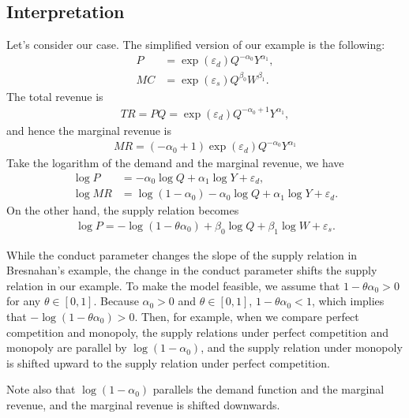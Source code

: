 \documentclass[11pt, a4paper]{article}
\theoremstyle{remark}
\begin{document}
\subsection{Interpretation}




Let's consider our case.
The simplified version of our example is the following:
\begin{align}
    P & = \exp(\varepsilon_{d}) Q^{-\alpha_0} Y^{\alpha_1},\label{eq:simple_demand} \\
    MC & = \exp(\varepsilon_{s}) Q^{\beta_0} W^{\beta_1}. \label{eq:simple_marginal_cost}
\end{align}
The total revenue is
\begin{align}
    TR = PQ = \exp(\varepsilon_{d}) Q^{-\alpha_0+1} Y^{\alpha_1},
\end{align}
and hence the marginal revenue is
\begin{align}
    MR = (-\alpha_0+1)\exp(\varepsilon_{d}) Q^{-\alpha_0} Y^{\alpha_1}
\end{align}
Take the logarithm of the demand and the marginal revenue, we have
\begin{align}
    \log P & = -\alpha_0 \log Q + \alpha_1 \log Y + \varepsilon_d,\\
    \log MR& = \log (1 -\alpha_0) -\alpha_0 \log Q + \alpha_1 \log Y + \varepsilon_d.
\end{align}
On the other hand, the supply relation becomes
\begin{align}
    \log P = -\log (1 - \theta \alpha_0) + \beta_0 \log Q + \beta_1 \log W + \varepsilon_s. \label{eq:simple_supply}
\end{align}

While the conduct parameter changes the slope of the supply relation in Bresnahan's example, the change in the conduct parameter shifts the supply relation in our example.
To make the model feasible, we assume that $1- \theta \alpha_0 >0$ for any $\theta \in [0,1]$.
Because $\alpha_0>0$ and $\theta \in [0,1]$, $1- \theta\alpha_0 <1$, which implies that $- \log(1- \theta\alpha_0) > 0$.
Then, for example, when we compare perfect competition and monopoly,  the supply relations under perfect competition and monopoly are parallel by $\log(1 - \alpha_0)$, and the supply relation under monopoly is shifted upward to the supply relation under perfect competition.

Note also that $\log (1 - \alpha_0)$ parallels the demand function and the marginal revenue, and the marginal revenue is shifted downwards.
\end{document}
